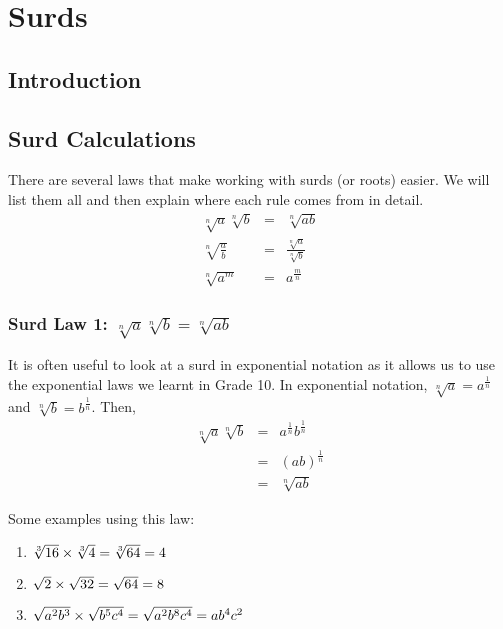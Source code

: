 \chapter{Surds}
\label{m:ng11}

\section{Introduction}


\section{Surd Calculations}

There are several laws that make working with surds (or roots) easier. We will list them all and then explain where each rule comes from in detail.
\begin{eqnarray}
\label{eq:mn:s:1}
\sqrt[n]{a}\sqrt[n]{b}&=&\sqrt[n]{ab}\\
\label{eq:mn:s:2}
\sqrt[n]{\frac ab}&=&\frac{\sqrt[n]{a}}{\sqrt[n]{b}}\\
\label{eq:mn:s:3}
\sqrt[n]{a^m}&=&a^{\frac mn}
\end{eqnarray}

\subsection{Surd Law 1: $\sqrt[n]{a}\sqrt[n]{b}=\sqrt[n]{ab}$}
It is often useful to look at a surd in exponential notation as it allows us to use the exponential laws we learnt in Grade 10. In exponential notation, $\sqrt[n]{a}=a^{\frac{1}{n}}$ and $\sqrt[n]{b}=b^{\frac{1}{n}}$. Then,
\begin{eqnarray}
\label{eq:mn:s:1:exp}
\sqrt[n]{a}\sqrt[n]{b}&=&a^{\frac 1n}b^{\frac 1n}\\ \nonumber
&=&(ab)^{\frac 1n}\\ \nonumber
&=&\sqrt[n]{ab}
\end{eqnarray}

Some examples using this law:
\begin{enumerate}
\item{$\sqrt[3]{16}\times \sqrt[3]{4} \\= \sqrt[3]{64}\\=4$}
\item{$\sqrt{2}\times \sqrt{32}\\=\sqrt{64}\\=8$}
\item{$\sqrt{a^2b^3}\times \sqrt{b^5c^4}\\=\sqrt{a^2b^8c^4}\\= ab^4c^2$}
\end{enumerate}

